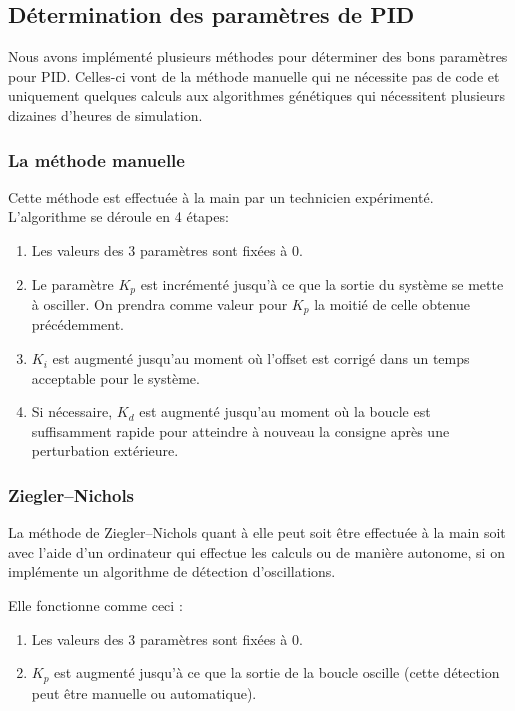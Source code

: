 \documentclass[a4paper,10pt]{report}
\begin{document}
\subsection{Détermination des paramètres de PID}

Nous avons implémenté plusieurs méthodes pour déterminer des bons paramètres pour PID. Celles-ci vont de la méthode manuelle qui ne nécessite pas de code et uniquement quelques calculs aux algorithmes génétiques qui nécessitent plusieurs dizaines d'heures de simulation.

\subsubsection{La méthode manuelle}

Cette méthode est effectuée à la main par un technicien expérimenté.
L'algorithme se déroule en 4 étapes:
\begin{enumerate}
    \item Les valeurs des 3 paramètres sont fixées à $0$.
    \item Le paramètre $K_p$ est incrémenté jusqu'à ce que la sortie du système se mette à osciller.
    On prendra comme valeur pour $K_p$ la moitié de celle obtenue précédemment.
    \item $K_i$ est augmenté jusqu'au moment où l'offset est corrigé dans un temps acceptable pour le système.
    \item Si nécessaire, $K_d$ est augmenté jusqu'au moment où la boucle est suffisamment rapide pour atteindre à nouveau la consigne après une perturbation extérieure.
\end{enumerate}

\subsubsection{Ziegler–Nichols}
La méthode de Ziegler–Nichols quant à elle peut soit être effectuée à la main soit avec l'aide d'un ordinateur qui effectue les calculs ou de manière autonome, si on implémente un algorithme de détection d'oscillations.

Elle fonctionne comme ceci :
\begin{enumerate}
    \item Les valeurs des 3 paramètres sont fixées à $0$.
    \item $K_p$ est augmenté jusqu'à ce que la sortie de la boucle oscille (cette détection peut être manuelle ou automatique).
\end{enumerate}
\end{document}
